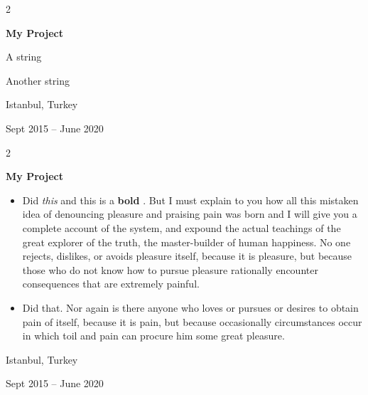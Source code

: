 \documentclass[10pt, letterpaper]{article}
\newenvironment{summary}{
    \begin{description}[
        topsep=0.10 cm,
        parsep=0.10 cm,
        partopsep=0pt,
        itemsep=0pt,
        leftmargin=0.4 cm + 10pt
    ]
}{
    \end{description}
} %
\newenvironment{highlights}{
    \begin{itemize}[
        topsep=0.10 cm,
        parsep=0.10 cm,
        partopsep=0pt,
        itemsep=0pt,
        leftmargin=0.4 cm + 10pt
    ]
}{
    \end{itemize}
} %
\newenvironment{twocolentry}[2][]{
    \onecolentry
    \def\secondColumn{#2}
    \setcolumnwidth{\fill, 4.5 cm}
    \begin{paracol}{2}
}{
    \switchcolumn \raggedleft \secondColumn
    \end{paracol}
    \endonecolentry
} %
\let\hrefWithoutArrow\href
\renewcommand{\href}[2]{\hrefWithoutArrow{#1}{\ifthenelse{\equal{#2}{}}{ }{#2 }\raisebox{.15ex}{\footnotesize \faExternalLink*}}}
\begin{document}
        \vspace{0.2 cm}

        \begin{twocolentry}{
            Istanbul, Turkey

        Sept 2015 – June 2020
        }
            \textbf{My Project}
            \begin{summary}
                \item A string
                \item Another string
            \end{summary}
        \end{twocolentry}


        \vspace{0.2 cm}

        \begin{twocolentry}{
            Istanbul, Turkey

        Sept 2015 – June 2020
        }
            \textbf{My Project}
            \begin{highlights}
                \item Did \textit{this} and this is a \textbf{bold} \href{https://example.com}{link}. But I must explain to you how all this mistaken idea of denouncing pleasure and praising pain was born and I will give you a complete account of the system, and expound the actual teachings of the great explorer of the truth, the master-builder of human happiness. No one rejects, dislikes, or avoids pleasure itself, because it is pleasure, but because those who do not know how to pursue pleasure rationally encounter consequences that are extremely painful.
                \item Did that. Nor again is there anyone who loves or pursues or desires to obtain pain of itself, because it is pain, but because occasionally circumstances occur in which toil and pain can procure him some great pleasure.
            \end{highlights}
        \end{twocolentry}


        \vspace{0.2 cm}
\end{document}

